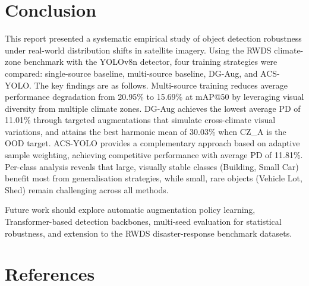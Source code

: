 \documentclass[12pt,a4paper]{article}
\begin{document}
\section{Conclusion}

This report presented a systematic empirical study of object detection robustness under real-world distribution shifts in satellite imagery. Using the RWDS climate-zone benchmark with the YOLOv8n detector, four training strategies were compared: single-source baseline, multi-source baseline, DG-Aug, and ACS-YOLO. The key findings are as follows. Multi-source training reduces average performance degradation from 20.95\% to 15.69\% at mAP@50 by leveraging visual diversity from multiple climate zones. DG-Aug achieves the lowest average PD of 11.01\% through targeted augmentations that simulate cross-climate visual variations, and attains the best harmonic mean of 30.03\% when CZ\_A is the OOD target. ACS-YOLO provides a complementary approach based on adaptive sample weighting, achieving competitive performance with average PD of 11.81\%. Per-class analysis reveals that large, visually stable classes (Building, Small Car) benefit most from generalisation strategies, while small, rare objects (Vehicle Lot, Shed) remain challenging across all methods.

Future work should explore automatic augmentation policy learning, Transformer-based detection backbones, multi-seed evaluation for statistical robustness, and extension to the RWDS disaster-response benchmark datasets.


\section*{References}
\end{document}
